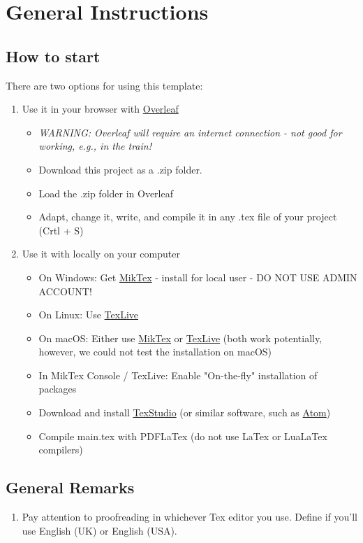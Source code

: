 \documentclass[12pt,oneside]{article}
\begin{document}
	\section{General Instructions} 
	\subsection{How to start} 
	There are two options for using this template:
	\begin{enumerate}
		\item Use it in your browser with \href{https://www.overleaf.com/}{Overleaf}
			\begin{itemize}
				\item[] \textit{WARNING: Overleaf will require an internet connection - not good for working, e.g., in the train!}
				\item Download this project as a .zip folder.
				\item Load the .zip folder in Overleaf
				\item Adapt, change it, write, and compile it in any .tex file of your project (Crtl + S)
			\end{itemize}
		\item Use it with locally on your computer
			\begin{itemize}
				\item On Windows: Get \href{https://miktex.org/howto/install-miktex}{MikTex} - install for local user - DO NOT USE ADMIN ACCOUNT!
				\item On Linux: Use \href{https://en.wikipedia.org/wiki/TeX_Live}{TexLive}
				\item On macOS: Either use \href{https://miktex.org/howto/install-miktex}{MikTex} or \href{https://en.wikipedia.org/wiki/TeX_Live}{TexLive} (both work potentially, however, we could not test the installation on macOS)
				\item In MikTex Console / TexLive: Enable "On-the-fly" installation of packages
				\item Download and install \href{https://www.texstudio.org/}{TexStudio} (or similar software, such as \href{https://atom.io}{Atom})
				\item Compile main.tex with PDFLaTex (do not use LaTex or LuaLaTex compilers)
			\end{itemize} 
	\end{enumerate}

	\subsection{General Remarks}
	\begin{enumerate}
		\item Pay attention to proofreading in whichever Tex editor you use. Define if you'll use English (UK) or English (USA).

	\end{enumerate}
\end{document}

